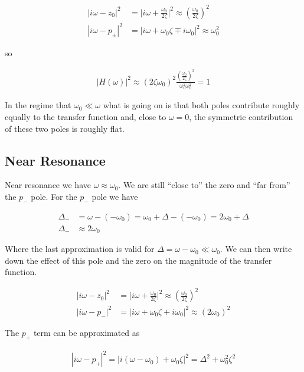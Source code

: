 \documentclass[12pt]{article}
\begin{document}
\begin{align}
|i\omega-z_0|^2 &= \Big\lvert i\omega + \frac{\omega_0}{2\zeta}\Big\rvert^2 \approx \left(\frac{\omega_0}{2\zeta} \right)^2\\
|i\omega-p_{\pm}|^2 &= \lvert i\omega + \omega_0\zeta \mp i\omega_0\rvert^2 \approx \omega_0^2
\end{align}

so

\begin{align}
|H(\omega)|^2 \approx (2 \zeta \omega_0)^2 \frac{\left(\frac{\omega_0}{2\zeta} \right)^2}{\omega_0^2\omega_0^2} = 1
\end{align}

In the regime that $\omega_0 \ll \omega$ what is going on is that both poles contribute roughly equally to the transfer function and, close to $\omega = 0$, the symmetric contribution of these two poles is roughly flat.

\subsection{Near Resonance}
Near resonance we have $\omega \approx \omega_0$. We are still ``close to'' the zero and ``far from'' the $p_-$ pole. For the $p_-$ pole we have

\begin{align}
\Delta_- &= \omega - (-\omega_0) = \omega_0 + \Delta - ( -\omega_0) = 2\omega_0 + \Delta\\
\Delta_- &\approx 2\omega_0
\end{align}

Where the last approximation is valid for $\Delta = \omega-\omega_0 \ll \omega_0$. We can then write down the effect of this pole and the zero on the magnitude of the transfer function.

\begin{align}
|i\omega-z_0|^2 &= \Big\lvert i\omega + \frac{\omega_0}{2\zeta}\Big\rvert^2 \approx \left(\frac{\omega_0}{2\zeta} \right)^2\\
|i\omega-p_-|^2 &= \lvert i\omega + \omega_0\zeta + i\omega_0\rvert^2 \approx (2\omega_0)^2
\end{align}

The $p_+$ term can be approximated as

\begin{align}
|i\omega - p_+|^2 = \lvert i(\omega-\omega_0) + \omega_0 \zeta \rvert^2 = \Delta^2 + \omega_0^2 \zeta^2
\end{align}
\end{document}
